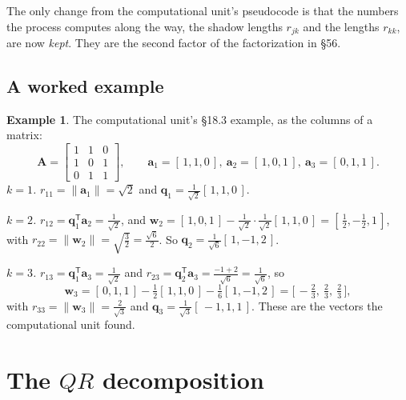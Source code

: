 \documentclass[11pt]{article}
\theoremstyle{plain}
\theoremstyle{definition}
\newtheorem{ex}{Example}[section]
\theoremstyle{remark}
\newcommand{\vc}[1]{\mathbf{#1}}
\newcommand{\mt}[1]{\mathbf{#1}}
\newcommand{\norm}[1]{\lVert #1\rVert}
\newcommand{\T}{^{\mathsf{T}}}
\begin{document}
\noindent The only change from the computational unit's pseudocode is that the
numbers the process computes along the way, the shadow lengths $r_{jk}$ and the
lengths $r_{kk}$, are now \emph{kept}. They are the second factor of the
factorization in \S56.

\subsection{A worked example}
\begin{ex}
\label{ex:gs}
The computational unit's \S18.3 example, as the columns of a matrix:
\[
  \mt{A}=\begin{bmatrix}1&1&0\\1&0&1\\0&1&1\end{bmatrix},
  \qquad
  \vc{a}_1=[\,1,1,0\,],\ \vc{a}_2=[\,1,0,1\,],\ \vc{a}_3=[\,0,1,1\,].
\]
\emph{$k=1$.} $r_{11}=\norm{\vc{a}_1}=\sqrt2$ and $\vc{q}_1=\frac{1}{\sqrt2}[\,1,1,0\,]$.

\emph{$k=2$.} $r_{12}=\vc{q}_1\T\vc{a}_2=\frac{1}{\sqrt2}$, and
$\vc{w}_2=[\,1,0,1\,]-\frac{1}{\sqrt2}\cdot\frac{1}{\sqrt2}[\,1,1,0\,]=[\,\frac12,-\frac12,1\,]$,
with $r_{22}=\norm{\vc{w}_2}=\sqrt{\frac32}=\frac{\sqrt6}{2}$. So
$\vc{q}_2=\frac{1}{\sqrt6}[\,1,-1,2\,]$.

\emph{$k=3$.} $r_{13}=\vc{q}_1\T\vc{a}_3=\frac{1}{\sqrt2}$ and
$r_{23}=\vc{q}_2\T\vc{a}_3=\frac{-1+2}{\sqrt6}=\frac{1}{\sqrt6}$, so
\[
  \vc{w}_3=[\,0,1,1\,]-\tfrac12[\,1,1,0\,]-\tfrac16[\,1,-1,2\,]
  =\bigl[\,-\tfrac23,\ \tfrac23,\ \tfrac23\,\bigr],
\]
with $r_{33}=\norm{\vc{w}_3}=\frac{2}{\sqrt3}$ and $\vc{q}_3=\frac{1}{\sqrt3}[\,-1,1,1\,]$.
These are the vectors the computational unit found.
\end{ex}

\section{The \texorpdfstring{$QR$}{QR} decomposition}

\end{document}
